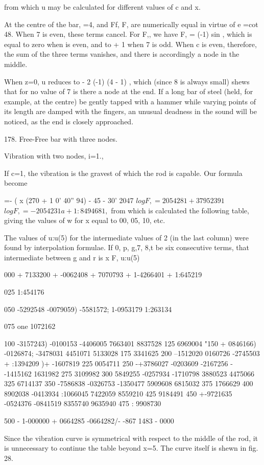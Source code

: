 from which u may be calculated for different values of c and x.


At the centre of the bar, =4, and Ff, F, are numerically equal in virtue
of e =cot 48. When 7 is even, these terms cancel. For F,, we have F, =
(-1) sin , which is equal to zero when is even, and to + 1 when 7 is
odd. When c is even, therefore, the sum of the three terms vanishes, and
there is accordingly a node in the middle.

When z=0, u reduces to - 2 (-1) (4 - 1) , which (since 8 is always small)
shews that for no value of 7 is there a node at the end. If a
long bar of steel (held, for example, at the centre) be gently tapped
with a hammer while varying points of its length are damped with the
fingers, an unusual deadness in the sound will be noticed, as the end is
closely approached.

178. Free-Free bar with three nodes.

Vibration with two nodes, i=1.,

If c=1, the vibration is the gravest of which the rod is capable. Our
formula become

=- ( x (270 + 1 0' 40'' 94) - 45 - 30' 2047
\(
log F,= 2054281 +37952391
\)
\(
log F, = - 2054231 a + 1:8494681,
\)
from which is calculated the following
table, giving the values of w for x equal to 00, 05, 10, etc.

The values of u:u(5) for the intermediate values of 2 (in the last column)
were found by interpolation formulae. If 0, p, g,7, 8,t be six
consecutive terms, that intermediate between g and r is x F, u:u(5)

000 + 7133200 + -0062408 + 7070793 + 1-4266401 + 1:645219

025 1:454176

050 -5292548 -0079059) -5581572; 1-0953179 1:263134

075 one 1072162

100 -3157243) -0100153 -4406005 7663401 8837528 125 6969004 "150 +
0846166) -0126874; -3478031 4451071 5133028 175 3341625 200 --1512020
0160726 -2745503 + :1394209 )+ -1607819 225 0054711 250 -+3786027
-0203609 -2167256 - -1415162 1631982 275 3109982 300 5849255 -0257934
-1710798 3880523 4475066 325 6714137 350 -7586838 -0326753 -1350477
5909608 6815032 375 1766629 400 8902038 -0413934 :1066045 7422059
8559210 425 9184491 450 +-9721635 -0524376 -0841519 8355740 9635940 475
: 9908730

500 - 1-000000 + 0664285 -0664282/- -867 1483 - 0000

Since the vibration curve is symmetrical with respect to the middle of
the rod, it is unnecessary to continue the table beyond x=5. The curve
itself is shewn in fig. 28.

